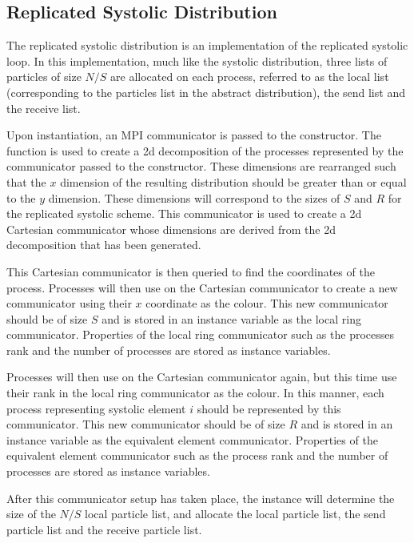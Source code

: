 \subsection{Replicated Systolic Distribution}

The replicated systolic distribution is an implementation of the
replicated systolic loop.
%
In this implementation, much like the systolic distribution,
three lists of particles of size $N/S$ are allocated on each process,
referred to as the local list (corresponding to the particles list
in the abstract distribution), the send list and the receive list.

Upon instantiation, an MPI communicator is passed to the constructor.
%
The \mpidimscreate{} function is used to create a 2d decomposition
of the processes represented by the communicator passed to the
constructor.
%
These dimensions are rearranged such that the $x$ dimension of the
resulting distribution should be greater than or equal to the $y$
dimension.
%
These dimensions will correspond to the sizes of $S$ and $R$ for
the replicated systolic scheme.
%
This communicator is used to create a 2d Cartesian communicator whose
dimensions are derived from the 2d decomposition that has been generated.

This Cartesian communicator is then queried to find the coordinates of
the process.
%
Processes will then use \mpicommsplit{} on the Cartesian communicator
to create a new communicator using their $x$ coordinate as the colour.
%
This new communicator should be of size $S$ and
is stored in an instance variable as the local ring communicator.
%
Properties of the local ring communicator such as the processes rank
and the number of processes are stored as instance variables.

Processes will then use \mpicommsplit{} on the Cartesian communicator
again, but this time use their rank in the local ring communicator as
the colour.
%
In this manner, each process representing systolic element $i$ should
be represented by this communicator.
%
This new communicator should be of size $R$ and is stored in an instance
variable as the equivalent element communicator.
%
Properties of the equivalent element communicator such as the process rank
and the number of processes are stored as instance variables.

After this communicator setup has taken place, the instance will determine
the size of the $N/S$ local particle list, and allocate the local particle
list, the send particle list and the receive particle list.

